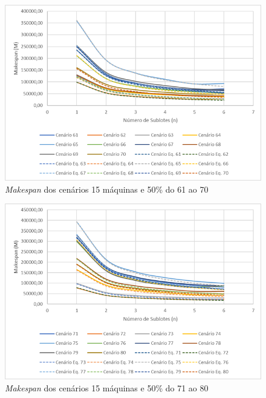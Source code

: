 \begin{figure}[H]
    \centering
     \includegraphics[width=13cm]{Apendices/Figuras/15m50_61-70.png}
     \caption{\textit{Makespan} dos cenários 15 máquinas e 50\% do 61 ao 70}
    \label{fig:15m50_61-70}
\end{figure}

\begin{figure}[H]
    \centering
     \includegraphics[width=13cm]{Apendices/Figuras/15m50_71-80.png}
     \caption{\textit{Makespan} dos cenários 15 máquinas e 50\% do 71 ao 80}
    \label{fig:15m50_71-80}
\end{figure}

